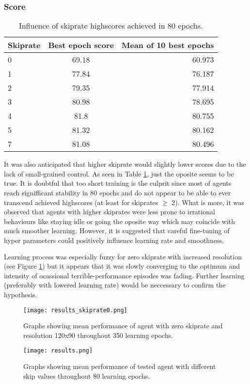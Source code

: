		\subsubsection*{Score}
			\begin{table}
				\begin{center}
					\begin{tabular}{ |l || c | r |}
						\hline
						Skiprate & Best epoch score & Mean of 10 best epochs \\ \hline
						0 & 69.18 & 60.973 \\ \hline
						1 & 77.84 & 76.187 \\ \hline
						2 & 79.35 & 77.914 \\ \hline
						3 & 80.98 & 78.695 \\ \hline
						4 & 81.8 & 80.755 \\ \hline
						5 & 81.32 & 80.162 \\ \hline
						7 & 81.08 & 80.496 \\ \hline
					\end{tabular}
				\end{center}
				\caption{Influence of skiprate highscores achieved in 80 epochs.}\label{tab:results}
			\end{table}
			It was also anticipated that higher skiprate would slightly lower scores due to the lack of small-grained control. As seen in Table \ref{tab:results}, just the oposite seems to be true. It is doubtful that too short training is the culprit since most of agents reach signifficant stability in 80 epochs and do not appear to be able to ever transcend achieved highscores (at least for skiprates $\geq$ 2). What is more, it was observed that agents with higher skiprates were less prone to irrational behaviours like staying idle or going the oposite way which may coincide with much smoother learning. However, it is suggested that careful fine-tuning of hyper parameters could positively influence learning rate and smoothness. 

			Learning process was especially fuzzy for zero skiprate with increased resolution (see Figure \ref{fig:results_skiprate0}) but it appears that it was slowly converging to the optimum and intensity of ocassional terrible-performance episodes was fading. Further learning (preferably with lowered learning rate) would be neccessary to confirm the hypothesis.
	
	\begin{figure}
		\centering
		\texttt{[image: results\_skiprate0.png]}
		\caption{Graphs showing mean performance of agent with zero skiprate and resolution 120x90 throughout 350 learning epochs.}\label{fig:results_skiprate0}
	\end{figure}

	\begin{figure}
		\centering
		\texttt{[image: results.png]}
		\caption{Graphs showing mean performance of tested agent with different skip values throughout 80 learning epochs.}\label{fig:results}
	\end{figure}
